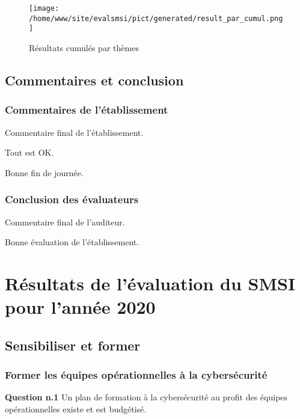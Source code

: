 \begin{figure}[ht]
\begin{center}\texttt{[image: /home/www/site/evalsmsi/pict/generated/result\_par\_cumul.png]}\end{center}
\caption{Résultats cumulés par thèmes}
\end{figure}

\subsection{Commentaires et conclusion}

\subsubsection{Commentaires de l'établissement}

\par
Commentaire final de l'établissement.

Tout est OK.

Bonne fin de journée.
\par\subsubsection{Conclusion des évaluateurs}

\par
Commentaire final de l'auditeur.

Bonne évaluation de l'établissement.
\par\clearpage


\section{Résultats de l'évaluation du SMSI pour l'année 2020}

\subsection{Sensibiliser et former}

\subsubsection{Former les équipes opérationnelles à la cybersécurité}

\textbf{Question n.1} Un plan de formation à la cybersécurité au profit des équipes opérationnelles  existe et est budgétisé.

